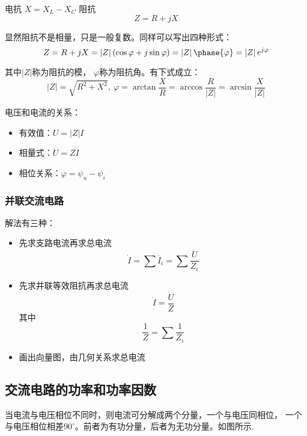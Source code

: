 电抗 $X=X_L-X_C$
阻抗 
\[
    Z=R+jX
\]

显然阻抗不是相量，只是一般复数。同样可以写出四种形式：
\[
    Z=R+jX= \left\lvert Z \right\rvert (\cos \varphi + j\sin \varphi ) = \left\lvert Z \right\rvert \phase{\varphi} = \left\lvert Z \right\rvert e^{j\varphi}
\]

其中$\left\lvert Z \right\rvert$称为阻抗的模，
$\varphi$称为阻抗角。有下式成立：
\[
    \left\lvert Z \right\rvert = \sqrt{R^2+X^2},~ \varphi = \arctan \frac{X}{R} = \arccos \frac{R}{\left\lvert Z \right\rvert} = \arcsin \frac{X}{\left\lvert Z \right\rvert}
\]

电压和电流的关系：

\begin{itemize}
    \item 有效值：$U=\left\lvert Z \right\rvert I$
    \item 相量式：$\dot{U}=Z\dot{I}$
    \item 相位关系：$\varphi = \psi _u - \psi _i $
\end{itemize}

\subsubsection{并联交流电路}

解法有三种：
\begin{itemize}
    \item 先求支路电流再求总电流
     \[\dot{I}=\sum \dot{I_i}=\sum \frac{\dot{U}}{Z_i}\]
    \item 先求并联等效阻抗再求总电流 
    \[\dot{I}=\frac{\dot{U}}{Z} \]
    其中 
    \[\frac{1}{Z}=\sum \frac{1}{Z_i}\]
    \item 画出向量图，由几何关系求总电流
\end{itemize}


\subsection{交流电路的功率和功率因数}


\begin{wrapfigure}{right}{70mm}
\end{wrapfigure}
当电流与电压相位不同时，则电流可分解成两个分量，一个与电压同相位，
一个与电压相位相差$90^\circ$。前者为有功分量，后者为无功分量。如图所示.

